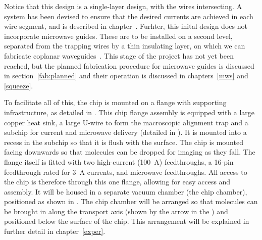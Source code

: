 Notice that this design is a single-layer design, with the wires intersecting.
A system has been devised to ensure that the desired currents are achieved in
each wire segment, and is described in chapter~. Furhter, this
inital design does not incorporate microwave guides. These are to be
installed on a second level, separated from the trapping wires by a thin
insulating layer, on which we can fabricate coplanar waveguides~\cite{1127105}.
This stage of the project has not yet been reached, but the planned fabrication
procedure for microwave guides is discussed in section~\ref{fab:planned} and
their operation is discussed in chapters~\ref{mws} and \ref{squeeze}.

To facilitate all of this, the chip is mounted on a flange with supporting
infrastructure, as detailed in . This chip
flange assembly is equipped with a large copper heat sink, a large U-wire to
form the macroscopic alignment trap and a subchip for current and microwave
delivery (detailed in ). It is mounted into a
recess in the subchip so that it is flush with the surface. The chip is mounted
facing downwards so that molecules can be dropped for imaging as they fall. The
flange itself is fitted with two high-current (\SI{100}{\ampere}) feedthroughs,
a 16-pin feedthrough rated for \SI{3}{\ampere} currents, and microwave
feedthroughs. All access to the chip is therefore through this one flange,
allowing for easy access and assembly.  It will be housed in a separate vacuum
chamber (the chip chamber), positioned as shown in
. The chip chamber will be arranged so that
molecules can be brought in along the transport axis (shown by the arrow in the
) and positioned below the surface of
the chip. This arrangement will be explained in further detail in
chapter~\ref{exper}.

